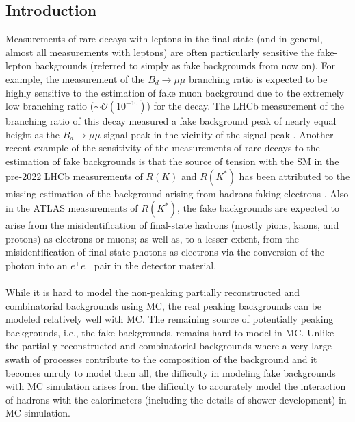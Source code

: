 %
%
%
%
\subsection{Introduction}
\label{sec:introduction}
%
Measurements of rare decays with leptons in the final state (and in general, almost all measurements with leptons) are often particularly sensitive the fake-lepton backgrounds (referred to simply as fake backgrounds from now on). %
For example, the measurement of the $B_d \rightarrow \mu \mu $ branching ratio is expected to be highly sensitive to the estimation of fake muon background due to the extremely low branching ratio ($\sim \mathcal{O}(10^{-10})$) for the decay. %
The LHCb measurement of the branching ratio of this decay measured a fake background peak of nearly equal height as the $B_d \rightarrow \mu \mu $ signal peak in the vicinity of the signal peak \cite{LHCb:2021vsc}. %
Another recent example of the sensitivity of the measurements of rare decays to the estimation of fake backgrounds is that the source of tension with the SM in the pre-2022 LHCb measurements of $R(K)$ and $R(K^{\ast})$ has been attributed to the missing estimation of the background arising from hadrons faking electrons \cite{LHCb:2017avl, LHCb:2021trn, LHCbDec2022}. %
Also in the \mbox{ATLAS} measurements of $R(K^\ast)$, the fake backgrounds are expected to arise from the misidentification of final-state hadrons (mostly pions, kaons, and protons) as electrons or muons; as well as, to a lesser extent, from the misidentification of final-state photons as electrons via the conversion of the photon into an $e^+e^-$ pair in the detector material. %
\\\\
While it is hard to model the non-peaking partially reconstructed and combinatorial backgrounds using MC, the real peaking backgrounds can be modeled relatively well with MC. %
The remaining source of potentially peaking backgrounds, i.e., the fake backgrounds, remains hard to model in MC. %
Unlike the partially reconstructed and combinatorial backgrounds where a very large swath of processes contribute to the composition of the background and it becomes unruly to model them all, the difficulty in modeling fake backgrounds with MC simulation arises from the difficulty to accurately model the interaction of hadrons with the calorimeters (including the details of shower development) in MC simulation. %
